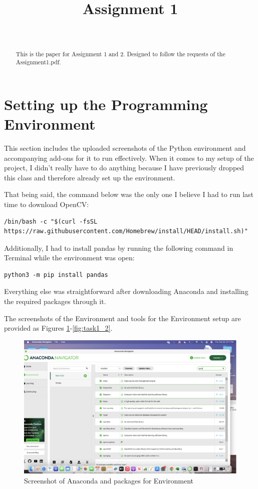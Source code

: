 \documentclass[conference]{IEEEtran} %
\begin{document}
\title{Assignment 1}

\author{
     \\
}

\maketitle

\begin{abstract}
This is the paper for Assignment 1 and 2.  Designed to follow the requests of the Assignment1.pdf.
\end{abstract}

\section{Setting up the Programming Environment}

This section includes the uploaded screenshots of the Python environment and accompanying add-ons for it to run effectively. When it comes to my setup of the project, I didn’t really have to do anything because I have previously dropped this class and therefore already set up the environment.

That being said, the command below was the only one I believe I had to run last time to download OpenCV:

\begin{lstlisting}
/bin/bash -c "$(curl -fsSL https://raw.githubusercontent.com/Homebrew/install/HEAD/install.sh)"
\end{lstlisting}

Additionally, I had to install pandas by running the following command in Terminal while the environment was open:

\begin{lstlisting}
python3 -m pip install pandas
\end{lstlisting}

Everything else was straightforward after downloading Anaconda and installing the required packages through it.

The screenshots of the Environment and tools for the Environment setup are provided as Figures \ref{fig:task1_1}-\ref{fig:task1_2}.

\begin{figure}[H]
    \centering
    \includegraphics[width=0.5\linewidth]{task1_1.png}
    \caption{Screenshot of Anaconda and packages for Environment}
    \label{fig:task1_1}
\end{figure}
\end{document}
